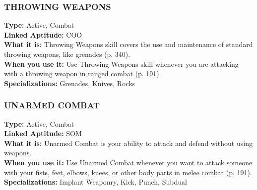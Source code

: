\subsubsection{THROWING WEAPONS}
\textbf{Type:} Active, Combat
\\ \textbf{Linked Aptitude:} COO
\\ \textbf{What it is:} Throwing Weapons skill covers the use
and maintenance of standard throwing weapons, like
grenades (p. 340).
\\ \textbf{When you use it:} Use Throwing Weapons skill
whenever you are attacking with a throwing weapon
in ranged combat (p. 191).
\\ \textbf{Specializations:} Grenades, Knives, Rocks



\subsubsection{UNARMED COMBAT}
\textbf{Type:} Active, Combat
\\ \textbf{Linked Aptitude:} SOM
\\ \textbf{What it is:} Unarmed Combat is your ability to attack and
defend without using weapons.
\\ \textbf{When you use it:} Use Unarmed Combat whenever you
want to attack someone with your fists, feet, elbows, knees,
or other body parts in melee combat (p. 191).
\\ \textbf{Specializations:} Implant Weaponry, Kick, Punch, Subdual

